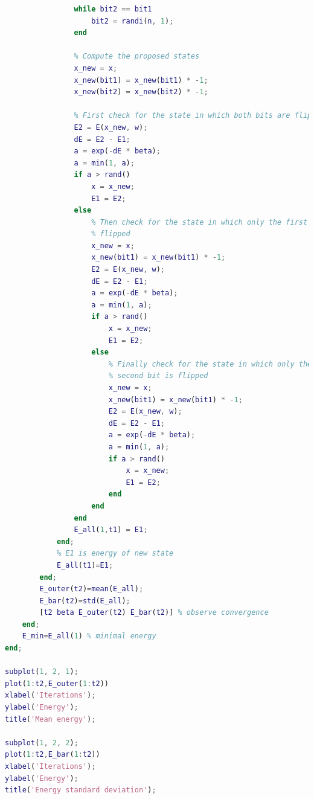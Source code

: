 \documentclass[10pt,a4paper]{article}
\begin{document}
\begin{lstlisting}[language=Matlab]
                % Choose a second bit which is unequal to the first bit
                while bit2 == bit1
                    bit2 = randi(n, 1);
                end
                
                % Compute the proposed states
                x_new = x;
                x_new(bit1) = x_new(bit1) * -1;
                x_new(bit2) = x_new(bit2) * -1;
                
                % First check for the state in which both bits are flipped
                E2 = E(x_new, w);
                dE = E2 - E1;
                a = exp(-dE * beta);
                a = min(1, a);
                if a > rand()
                    x = x_new;
                    E1 = E2;
                else
                    % Then check for the state in which only the first bit is
                    % flipped
                    x_new = x;
                    x_new(bit1) = x_new(bit1) * -1;
                    E2 = E(x_new, w);
                    dE = E2 - E1;
                    a = exp(-dE * beta);
                    a = min(1, a);
                    if a > rand()
                        x = x_new;
                        E1 = E2;
                    else
                        % Finally check for the state in which only the
                        % second bit is flipped
                        x_new = x;
                        x_new(bit1) = x_new(bit1) * -1;
                        E2 = E(x_new, w);
                        dE = E2 - E1;
                        a = exp(-dE * beta);
                        a = min(1, a);
                        if a > rand()
                            x = x_new;
                            E1 = E2;
                        end
                    end
                end
                E_all(1,t1) = E1;
			end;
			% E1 is energy of new state
			E_all(t1)=E1;
		end;
		E_outer(t2)=mean(E_all);
		E_bar(t2)=std(E_all);
		[t2 beta E_outer(t2) E_bar(t2)] % observe convergence
	end;
	E_min=E_all(1) % minimal energy 
end;

subplot(1, 2, 1);
plot(1:t2,E_outer(1:t2))
xlabel('Iterations');
ylabel('Energy');
title('Mean energy');

subplot(1, 2, 2);
plot(1:t2,E_bar(1:t2))
xlabel('Iterations');
ylabel('Energy');
title('Energy standard deviation');
\end{lstlisting}
\end{document}
